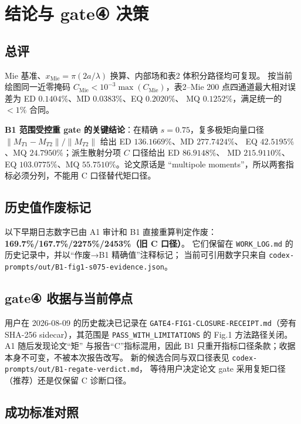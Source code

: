 \section{结论与 gate④ 决策}

\subsection{总评}

Mie 基准、$x_{\mathrm{Mie}}=\pi(2a/\lambda)$ 换算、内部场和表2 体积分路径均可复现。
按当前绘图同一近零掩码 $C_{\mathrm{Mie}}<10^{-3}\max(C_{\mathrm{Mie}})$，表2--Mie
200 点四通道最大相对误差为 ED $0.1404\%$、MD $0.0383\%$、EQ $0.2020\%$、
MQ $0.1252\%$，满足统一的 $<1\%$ 合同。

\textbf{B1 范围受控重 gate 的关键结论}：在精确 $s=0.75$，复多极矩向量口径
$\|M_{T1}-M_{T2}\|/\|M_{T2}\|$ 给出 ED $136.1669\%$、MD $277.7424\%$、
EQ $42.5195\%$、MQ $24.7950\%$；派生散射分项 $C$ 口径给出 ED $86.9148\%$、
MD $215.9110\%$、EQ $103.0775\%$、MQ $55.7510\%$。论文原话是
“multipole moments”，所以两套指标必须分列，不能用 C 口径替代矩口径。

\subsection{历史值作废标记}

以下早期日志数字已由 A1 审计和 B1 直接重算判定作废：
\textbf{169.7\%/167.7\%/2275\%/2453\%（旧 C 口径）}。
它们保留在 \texttt{WORK\_LOG.md} 的历史记录中，并以“作废→B1 精确值”注释标记；
当前可引用数字只来自 \texttt{codex-prompts/out/B1-fig1-s075-evidence.json}。

\subsection{gate④ 收据与当前停点}

用户在 2026-08-09 的历史裁决已记录在
\texttt{GATE4-FIG1-CLOSURE-RECEIPT.md}（旁有 SHA-256 sidecar），其范围是
\texttt{PASS\_WITH\_LIMITATIONS} 的 Fig.1 方法路径关闭。A1 随后发现论文“矩”
与报告“C”指标混用，因此 B1 只重开指标口径条款；收据本身不可变，不被本次报告改写。
新的候选合同与双口径表见 \texttt{codex-prompts/out/B1-regate-verdict.md}，
等待用户决定论文 gate 采用复矩口径（推荐）还是仅保留 C 诊断口径。

\subsection{成功标准对照}

